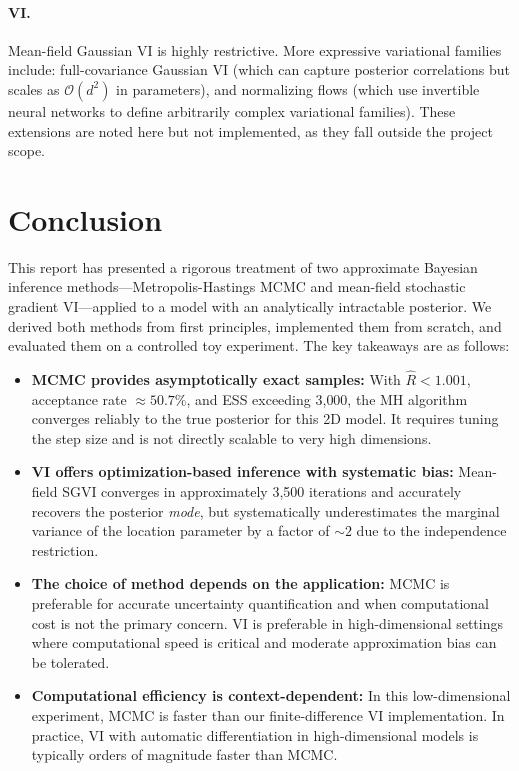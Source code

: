 \documentclass[12pt,a4paper]{article}
\begin{document}
\paragraph{VI.}
Mean-field Gaussian VI is highly restrictive.
More expressive variational families include:
full-covariance Gaussian VI (which can capture posterior correlations
but scales as $\mathcal{O}(d^2)$ in parameters),
and normalizing flows \citep{rezende2015variational,kingma2016improved}
(which use invertible neural networks to define arbitrarily complex
variational families).
These extensions are noted here but not implemented, as they fall
outside the project scope.

\section{Conclusion}
\label{sec:conclusion}

This report has presented a rigorous treatment of two approximate
Bayesian inference methods---Metropolis-Hastings MCMC and
mean-field stochastic gradient VI---applied to a model with an
analytically intractable posterior.
We derived both methods from first principles, implemented them from
scratch, and evaluated them on a controlled toy experiment.
The key takeaways are as follows:

\begin{itemize}
  \item \textbf{MCMC provides asymptotically exact samples:}
    With $\hat{R} < 1.001$, acceptance rate $\approx 50.7\%$,
    and ESS exceeding 3{,}000, the MH algorithm converges reliably
    to the true posterior for this 2D model.
    It requires tuning the step size and is not directly scalable
    to very high dimensions.

  \item \textbf{VI offers optimization-based inference with systematic bias:}
    Mean-field SGVI converges in approximately 3{,}500 iterations and
    accurately recovers the posterior \emph{mode}, but systematically
    underestimates the marginal variance of the location parameter
    by a factor of $\sim 2$ due to the independence restriction.

  \item \textbf{The choice of method depends on the application:}
    MCMC is preferable for accurate uncertainty quantification and
    when computational cost is not the primary concern.
    VI is preferable in high-dimensional settings where
    computational speed is critical and moderate approximation
    bias can be tolerated.

  \item \textbf{Computational efficiency is context-dependent:}
    In this low-dimensional experiment, MCMC is faster than our
    finite-difference VI implementation.
    In practice, VI with automatic differentiation in high-dimensional
    models is typically orders of magnitude faster than MCMC.
\end{itemize}
\end{document}
